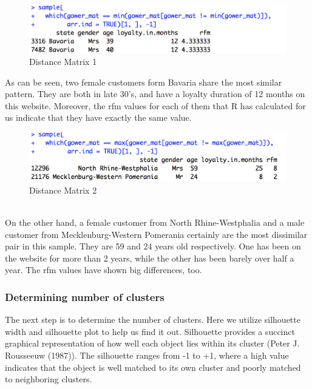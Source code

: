\documentclass[a4paper,12pt,fleqn]{article}
\begin{document}
\begin{figure}[h]
	\centering
	\includegraphics[width=0.95\linewidth]{"8.distance matrix 1"}
	\caption{Distance Matrix 1}
	\label{fig:8}
\end{figure}

As can be seen, two female customers form Bavaria share the most similar pattern. They are both in late 30's, and have a loyalty duration of 12 months on this website. Moreover, the rfm values for each of them that R has calculated for us indicate that they have exactly the same value.\\
\begin{figure}[h]
	\centering
	\includegraphics[width=0.7\linewidth]{"9.distance matrix 2"}
	\caption{Distance Matrix 2}
	\label{fig:9}
\end{figure}\\
On the other hand, a female customer from North Rhine-Westphalia and a male customer from Mecklenburg-Western Pomerania certainly are the most dissimilar pair in this sample. They are 59 and 24 years old respectively. One has been on the website for more than 2 years, while the other has been barely over half a year. The rfm values have shown big differences, too.

\subsubsection{Determining number of clusters }
The next step is to determine the number of clusters. Here we utilize silhouette width and silhouette plot to help us find it out. Silhouette provides a succinct graphical representation of how well each object lies within its cluster (Peter J. Rousseeuw (1987)). The silhouette ranges from -1 to +1, where a high value indicates that the object is well matched to its own cluster and poorly matched to neighboring clusters.
\end{document}
